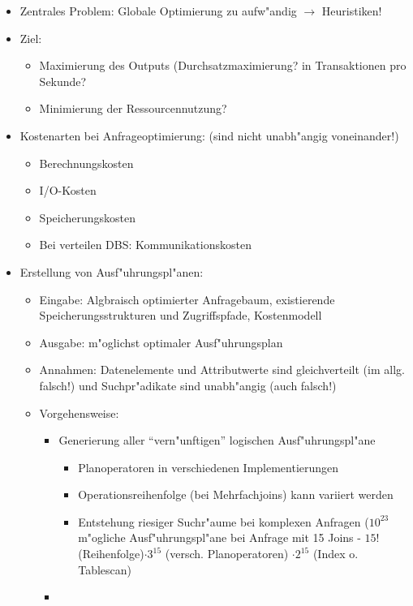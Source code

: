 \documentclass[a4paper, 12pt]{scrartcl}
\begin{document}
\begin{itemize}
	\item
		Zentrales Problem: Globale Optimierung zu aufw"andig  $\rightarrow$ Heuristiken!
	\item
		Ziel:
		\begin{itemize}
			\item
				Maximierung des Outputs (Durchsatzmaximierung? in Transaktionen pro Sekunde?
			\item
				Minimierung der Ressourcennutzung?
		\end{itemize}
	\item
		Kostenarten bei Anfrageoptimierung: (sind nicht unabh"angig voneinander!)
		\begin{itemize}
			\item
				Berechnungskosten
			\item
				I/O-Kosten
			\item
				Speicherungskosten
			\item
				Bei verteilen DBS: Kommunikationskosten
		\end{itemize}
	\item
		Erstellung von Ausf"uhrungspl"anen:
		\begin{itemize}
			\item
				Eingabe: Algbraisch optimierter Anfragebaum, existierende Speicherungsstrukturen und Zugriffspfade, Kostenmodell
			\item
				Ausgabe: m"oglichst optimaler Ausf"uhrungsplan
			\item
				Annahmen: Datenelemente und Attributwerte sind gleichverteilt (im allg. falsch!) und Suchpr"adikate sind unabh"angig (auch falsch!)
			\item
				Vorgehensweise:
				\begin{itemize}
					\item
						Generierung aller \enquote{vern"unftigen} logischen Ausf"uhrungspl"ane
						\begin{itemize}
							\item
								Planoperatoren in verschiedenen Implementierungen
							\item
								Operationsreihenfolge (bei Mehrfachjoins) kann variiert werden
							\item
								Entstehung riesiger Suchr"aume bei komplexen Anfragen ($10^{23}$ m"ogliche Ausf"uhrungspl"ane bei Anfrage mit 15 Joins - $15!$(Reihenfolge)$\cdot3^{15}$ (versch. Planoperatoren) $\cdot 2^{15}$ (Index o. Tablescan)
						\end{itemize}
					\item

\end{itemize}
\end{itemize}
\end{itemize}
\end{document}
